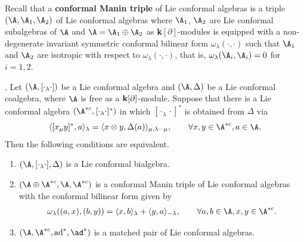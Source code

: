 \documentclass[12pt]{amsart}
\begin{document}
    Recall \cite{L} that a  {\bf conformal Manin triple} of Lie conformal algebras is a triple $(\A, \A_1,\A_2)$ of Lie conformal algebras  where $\A_1$, $\A_2$ are  Lie conformal subalgebras of $\A$ and $\A = \A_1\oplus \A_2$ as {\bf k}$[\partial]$-modules is equipped with a non-degenerate invariant symmetric conformal bilinear form  $\omega_\lambda(\cdot,\cdot)$ such that  $\A_1$ and $\A_2$ are isotropic with respect to $\omega_\lambda(\cdot,\cdot)$, that is, $\omega_\lambda(\A_i,\A_i)=0$  for $i =  1,2$.

    \begin{proposition}\cite[Theorem 3.9]{L}, \cite[Proposition 4.18]{HBG} \label{LCB-equ}
        Let $(\A, [\cdot_\lambda \cdot])$ be a  Lie conformal algebra and $(\A, \Delta)$ be a Lie conformal coalgebra, where $\A$ is free as a ${\bf k}[\partial]$-module. Suppose that there is a
        Lie conformal algebra  $(\A^{\ast c}, [\cdot_\lambda \cdot]^\ast)$  in which $[\cdot_\lambda \cdot]^\ast
        $ is obtained from $\Delta$ via
      \begin{equation}\label{eq:dual}\langle [x_\mu y]^\ast, a\rangle_\lambda=\langle  x\otimes y, \Delta(a)\rangle_{\mu, \lambda-\mu},\qquad \forall x, y\in \A^{\ast c}, a\in \A.\end{equation} Then the following conditions are equivalent.
        \begin{enumerate}
            \item {}$(\A, [\cdot_\lambda \cdot], \Delta)$ is a Lie conformal
            bialgebra.
            \item {} $(\A\oplus \A^{\ast c}, \A, \A^{\ast c})$ is a conformal Manin triple of Lie conformal algebras with the conformal bilinear form given by
            \begin{eqnarray}\label{eq-blf}
                \omega_\lambda ( (a,x), (b,y) )=\langle x,b\rangle_\lambda+\langle y,a\rangle_{-\lambda}, \qquad\forall a, b\in \A, x, y \in \A^{\ast c}.
            \end{eqnarray}
            \item {} $(\A, \A^{\ast c}, {\rm ad}^\ast, \ad^\ast)$ is a matched pair of Lie conformal algebras.
        \end{enumerate}
    \end{proposition}
\end{document}
